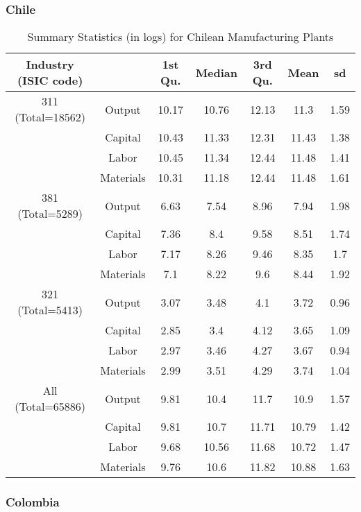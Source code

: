 \documentclass[11pt]{article}
\begin{document}
\subsubsection{Chile}

\begin{table}[H]
\centering
\caption{Summary Statistics (in logs) for Chilean Manufacturing Plants}
\begin{tabular}{ccccccc}
  \hline\hline Industry (ISIC code) &   & 1st Qu. & Median & 3rd Qu. & Mean & sd \\ 
  \hline
311 (Total=18562) & Output & 10.17 & 10.76 & 12.13 & 11.3 & 1.59 \\ 
   & Capital & 10.43 & 11.33 & 12.31 & 11.43 & 1.38 \\ 
   & Labor & 10.45 & 11.34 & 12.44 & 11.48 & 1.41 \\ 
   & Materials & 10.31 & 11.18 & 12.44 & 11.48 & 1.61 \\ 
  381 (Total=5289) & Output & 6.63 & 7.54 & 8.96 & 7.94 & 1.98 \\ 
   & Capital & 7.36 & 8.4 & 9.58 & 8.51 & 1.74 \\ 
   & Labor & 7.17 & 8.26 & 9.46 & 8.35 & 1.7 \\ 
   & Materials & 7.1 & 8.22 & 9.6 & 8.44 & 1.92 \\ 
  321 (Total=5413) & Output & 3.07 & 3.48 & 4.1 & 3.72 & 0.96 \\ 
   & Capital & 2.85 & 3.4 & 4.12 & 3.65 & 1.09 \\ 
   & Labor & 2.97 & 3.46 & 4.27 & 3.67 & 0.94 \\ 
   & Materials & 2.99 & 3.51 & 4.29 & 3.74 & 1.04 \\ 
  All (Total=65886) & Output & 9.81 & 10.4 & 11.7 & 10.9 & 1.57 \\ 
   & Capital & 9.81 & 10.7 & 11.71 & 10.79 & 1.42 \\ 
   & Labor & 9.68 & 10.56 & 11.68 & 10.72 & 1.47 \\ 
   & Materials & 9.76 & 10.6 & 11.82 & 10.88 & 1.63 \\ 
   \hline
\end{tabular}
\label{CHLsum}
\end{table}

\subsubsection{Colombia}
\end{document}
